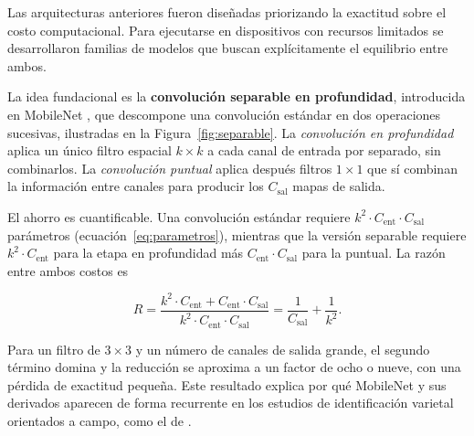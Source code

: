 Las arquitecturas anteriores fueron diseñadas priorizando la exactitud sobre
el costo computacional. Para ejecutarse en dispositivos con recursos
limitados se desarrollaron familias de modelos que buscan explícitamente el
equilibrio entre ambos.

La idea fundacional es la \textbf{convolución separable en profundidad},
introducida en MobileNet \citep{howard2017}, que descompone una convolución
estándar en dos operaciones sucesivas, ilustradas en la
Figura~\ref{fig:separable}. La \textit{convolución en profundidad} aplica un
único filtro espacial $k \times k$ a cada canal de entrada por separado, sin
combinarlos. La \textit{convolución puntual} aplica después filtros
$1 \times 1$ que sí combinan la información entre canales para producir los
$C_{\text{sal}}$ mapas de salida.

El ahorro es cuantificable. Una convolución estándar requiere
$k^{2} \cdot C_{\text{ent}} \cdot C_{\text{sal}}$ parámetros
(ecuación~\ref{eq:parametros}), mientras que la versión separable requiere
$k^{2} \cdot C_{\text{ent}}$ para la etapa en profundidad más
$C_{\text{ent}} \cdot C_{\text{sal}}$ para la puntual. La razón entre ambos
costos es

\begin{equation}
R = \frac{k^{2} \cdot C_{\text{ent}} + C_{\text{ent}} \cdot C_{\text{sal}}}
         {k^{2} \cdot C_{\text{ent}} \cdot C_{\text{sal}}}
  = \frac{1}{C_{\text{sal}}} + \frac{1}{k^{2}}.
\label{eq:separable}
\end{equation}

Para un filtro de $3\times3$ y un número de canales de salida grande, el
segundo término domina y la reducción se aproxima a un factor de ocho o
nueve, con una pérdida de exactitud pequeña. Este resultado explica por qué
MobileNet y sus derivados aparecen de forma recurrente en los estudios de
identificación varietal orientados a campo, como el de \citet{deng2025}.

